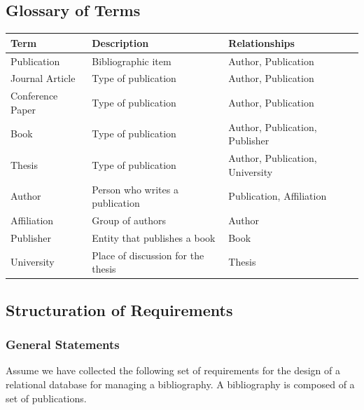 \documentclass[a4paper,12pt]{article}
\begin{document}
\subsection{Glossary of Terms}
\label{sec:glossario}
\begin{tabularx}{\textwidth}{l X X}
\toprule
\textbf{Term} & \textbf{Description} & \textbf{Relationships} \\
\midrule
Publication & Bibliographic item & Author, Publication \\
Journal Article & Type of publication & Author, Publication \\
Conference Paper & Type of publication & Author, Publication \\
Book & Type of publication & Author, Publication, Publisher \\
Thesis & Type of publication & Author, Publication, University \\
Author & Person who writes a publication & Publication, Affiliation \\
Affiliation & Group of authors & Author \\
Publisher & Entity that publishes a book & Book \\
University & Place of discussion for the thesis & Thesis \\
\bottomrule
\end{tabularx}

\subsection{Structuration of Requirements}
\label{sec:strutturazione}
\subsubsection{General Statements}
Assume we have collected the following set of requirements for the design of a relational database for managing a bibliography. A bibliography is composed of a set of publications.
\end{document}
